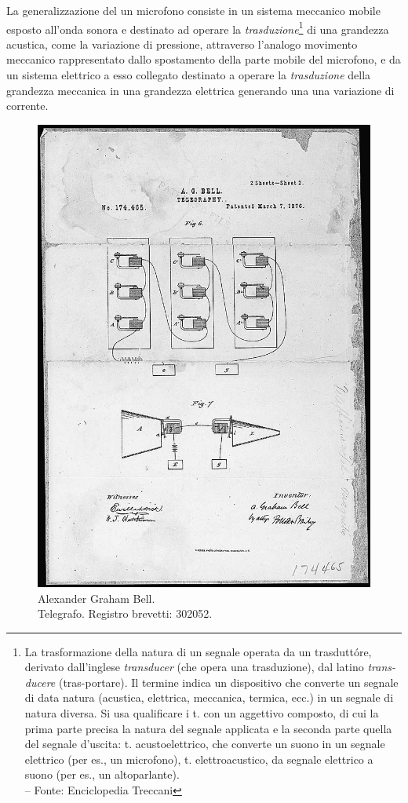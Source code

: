 \begin{refsection}
La generalizzazione del un microfono consiste in un sistema meccanico mobile esposto
all’onda sonora e destinato ad operare la \emph{trasduzione}\footnote{La
trasformazione della natura di un segnale operata da un trasduttóre,
derivato dall'inglese \emph{transducer} (che opera una trasduzione), dal latino
\emph{trans-ducere} (tras-portare). Il termine indica un dispositivo che converte
un segnale di data natura (acustica, elettrica, meccanica, termica, ecc.) in un
segnale di natura diversa. Si usa qualificare i t. con un aggettivo composto,
di cui la prima parte precisa la natura del segnale applicata e la seconda
parte quella del segnale d'uscita: t. acustoelettrico, che converte un suono in
un segnale elettrico (per es., un microfono), t. elettroacustico, da segnale
elettrico a suono (per es., un altoparlante). \\ – Fonte: Enciclopedia Treccani}
di una grandezza acustica, come la variazione di pressione, attraverso l'analogo
movimento meccanico rappresentato dallo spostamento della parte mobile del microfono, e da un sistema
elettrico a esso collegato destinato a operare la \emph{trasduzione} della
grandezza meccanica in una grandezza elettrica generando una una variazione di
corrente.

\begin{figure}[t!]
\centering
\includegraphics[width=0.99\columnwidth]{CAPITOLI/0200/img/telephone-patent-drawing-l.jpg}
\caption[]{Alexander Graham Bell.\\ Telegrafo. Registro brevetti: 302052.}
\label{agb:tel}
\end{figure}


\end{refsection}
